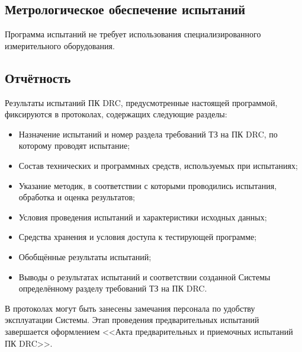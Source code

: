 \subsection{Метрологическое обеспечение испытаний}

Программа испытаний не требует
использования специализированного измерительного оборудования.

\subsection{Отчётность}

Результаты испытаний ПК DRC, предусмотренные настоящей программой,
фиксируются в протоколах, содержащих следующие разделы:

\begin{itemize}
	\item Назначение испытаний и номер раздела требований ТЗ на ПК DRC,
		по которому проводят испытание;
	\item Состав технических и программных средств,
		используемых при испытаниях;
	\item Указание методик, в соответствии с которыми проводились испытания,
		обработка и оценка результатов;
	\item Условия проведения испытаний и характеристики исходных данных;
	\item Средства хранения и условия доступа к тестирующей программе;
	\item Обобщённые результаты испытаний;
	\item Выводы о результатах испытаний
		и соответствии созданной Системы
		определённому разделу требований ТЗ на ПК DRC.
\end{itemize}

В протоколах могут быть занесены замечания персонала
по удобству эксплуатации Системы.
Этап проведения предварительных испытаний завершается
оформлением <<Акта предварительных и приемочных испытаний ПК DRC>>.

